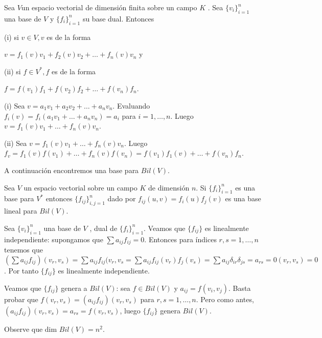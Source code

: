 		\begin{pro}
			\normalfont
			Sea $ V  $un espacio vectorial de dimensión finita sobre un campo $ K $ . Sea $ \{v_{i}\}^{n}_{i=1} $ una base de $ V $ y $ \{f_{i}\}^{n}_{i=1} $ su base dual. Entonces 
			
			(i) si $ v \in V, v $ es de la forma 
			\begin{center}
				$ v = f_{1}(v)v_{1}+f_{2}(v)v_{2}+\ldots+f_{n}(v)v_{n} $ y
			\end{center}
			(ii) si $ f \in V^{*}, f $ es de la forma 
			\begin{center}
				$ f = f(v_{1})f_{1}+f(v_{2})f_{2}+\ldots+f(v_{n})f_{n} $.
			\end{center}
		\end{pro}
		\begin{demo}
			\normalfont
			(i) Sea $ v = a_{1}v_{1}+a_{2}v_{2}+\ldots+a_{n}v_{n} $. Evaluando $ f_{i}(v) = f_{i}(a_{1}v_{1}+\ldots+a_{n}v_{n}) = a_{i}$ para $ i = 1,\ldots,n $. Luego $ v = f_{1}(v)v_{1}+\ldots+f_{n}(v)v_{n} $.
			
			(ii) Sea $ v = f_{1}(v)v_{1}+\ldots+f_{n}(v)v_{n} $. Luego $ f_{v} = f_{1}(v)f(v_{1})+\ldots+f_{n}(v)f(v_{n}) = f(v_{1})f_{1}(v)+\ldots+f(v_{n})f_{n} $.
			
			A continuación encontremos una base para $ Bil(V) $.
		\end{demo}
		\begin{pro}
			\normalfont 
			Sea $ V $ un espacio vectorial sobre un campo $ K $ de
			dimensión $ n $. Si $ \{f_{i}\}^{n}_{i=1} $ es una base para $ V^{*} $ entonces $ \{f_{ij}\}^{n}_{i,j=1} $ dado por $ f_{ij}(u,v) = f_{i}(u)f_{j}(v)$ es una base lineal para $ Bil(V) $.
		\end{pro}
		\begin{demo}
			\normalfont  Sea $ \{v_{i}\}^{n}_{i=1} $ una base de $ V $ , dual de $ \{f_{i}\}^{n}_{i=1} $. Veamos que $ \{f_{ij}\} $ es linealmente independiente: supongamos que $ \sum a_{ij}f_{ij} = 0 $. Entonces para índices $ r, s
			= 1, \ldots , n $ tenemos que $ (\sum a_{ij}f_{ij}) (v_{r},v_{s}) = \sum a_{ij}f_{ij} (v_{r},v_{s} = \sum a_{ij}f_{ij}(v_{r})f_{j}(v_{s}) = \sum a_{ij}\delta_{ir}\delta_{js} = a_{rs} = 0(v_{r}, v_{s}) = 0$. Por tanto $ \{f_{ij}\} $  es
			linealmente independiente.
			
			Veamos que $ \{f_{ij }\} $ genera a $ Bil(V ) $: sea $ f \in Bil(V )  $ y $ a_{ij} = f (v_{i} , v_{j} ) $. Basta probar que $ f (v_{r} , v_{s} ) = ( a_{ij} f_{ij} )(v_{r} , v_{s} )  $ para $ r, s = 1, \ldots, n $. Pero como antes, $ ( a_{ij} f_{ij} )(v_{r} , v_{s} ) = a_{rs} = f (v_{r} , v_{s} ) $, luego $ \{f_{ij}\} $ genera $ Bil(V ) $. 
			
			Observe que dim $ Bil(V ) = n^{2} $.
		\end{demo}
